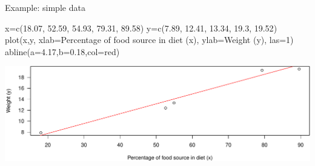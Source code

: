 \documentclass[
  ignorenonframetext,
  aspectratio=169]{beamer}
\newenvironment{Shaded}{\begin{snugshade}}{\end{snugshade}}
\newcommand{\AttributeTok}[1]{\textcolor[rgb]{0.77,0.63,0.00}{#1}}
\newcommand{\DecValTok}[1]{\textcolor[rgb]{0.00,0.00,0.81}{#1}}
\newcommand{\FloatTok}[1]{\textcolor[rgb]{0.00,0.00,0.81}{#1}}
\newcommand{\FunctionTok}[1]{\textcolor[rgb]{0.00,0.00,0.00}{#1}}
\newcommand{\NormalTok}[1]{#1}
\newcommand{\OtherTok}[1]{\textcolor[rgb]{0.56,0.35,0.01}{#1}}
\newcommand{\StringTok}[1]{\textcolor[rgb]{0.31,0.60,0.02}{#1}}
\begin{document}
\begin{frame}[fragile]{Example: simple data}
\protect\hypertarget{example-simple-data}{}
\small

\begin{Shaded}
\begin{Highlighting}[]
\NormalTok{x}\OtherTok{=}\FunctionTok{c}\NormalTok{(}\FloatTok{18.07}\NormalTok{, }\FloatTok{52.59}\NormalTok{, }\FloatTok{54.93}\NormalTok{, }\FloatTok{79.31}\NormalTok{, }\FloatTok{89.58}\NormalTok{)}
\NormalTok{y}\OtherTok{=}\FunctionTok{c}\NormalTok{(}\FloatTok{7.89}\NormalTok{, }\FloatTok{12.41}\NormalTok{, }\FloatTok{13.34}\NormalTok{, }\FloatTok{19.3}\NormalTok{, }\FloatTok{19.52}\NormalTok{)}
\FunctionTok{plot}\NormalTok{(x,y,}
     \AttributeTok{xlab=}\StringTok{\textquotesingle{}Percentage of food source in diet (x)\textquotesingle{}}\NormalTok{,}
     \AttributeTok{ylab=}\StringTok{\textquotesingle{}Weight (y)\textquotesingle{}}\NormalTok{,}
     \AttributeTok{las=}\DecValTok{1}\NormalTok{)}
\FunctionTok{abline}\NormalTok{(}\AttributeTok{a=}\FloatTok{4.17}\NormalTok{,}\AttributeTok{b=}\FloatTok{0.18}\NormalTok{,}\AttributeTok{col=}\StringTok{\textquotesingle{}red\textquotesingle{}}\NormalTok{)}
\end{Highlighting}
\end{Shaded}

\includegraphics{reg_and_simms_files/figure-beamer/unnamed-chunk-1-1.pdf}
\end{frame}
\end{document}
